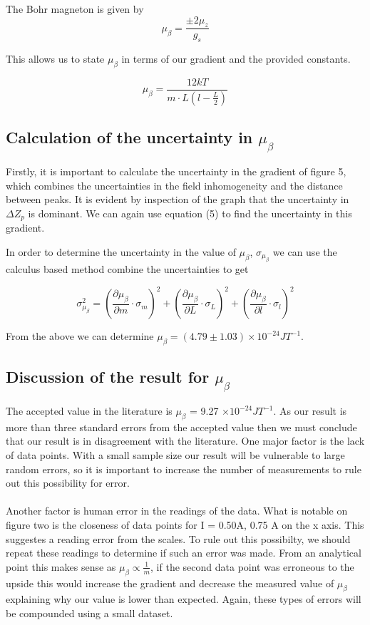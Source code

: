 \documentclass{article}%
\begin{document}
The Bohr magneton is given by 
\begin{equation}
    \mu_{\beta} = \frac{\pm 2 \mu_{z}}{g_s}
\end{equation}


This allows us to state  $\mu_\beta$ in terms of our gradient and the provided constants.

\begin{equation}
    \mu_{\beta} = \frac{12kT}{m \cdot L(l - \frac{L}{2})}
\end{equation}

\subsection{Calculation of the uncertainty in $\mu_{\beta}$}
Firstly, it is important to calculate the uncertainty in the gradient of figure 5, which combines the uncertainties in the field inhomogeneity and the distance between peaks. It is evident by inspection of the graph that the uncertainty in $\Delta Z_p$ is dominant. We can again use equation (5) to find the uncertainty in this gradient.

In order to determine the uncertainty in the value of $\mu_{\beta}$, $\sigma_{\mu_{\beta}}$ we can use the calculus based method combine the uncertainties to get

$$
\sigma_{\mu_{\beta}}^2 = ( \frac{\partial \mu_{\beta} }{\partial m}  \cdot \sigma_{m})^2 + ( \frac{\partial \mu_{\beta} }{\partial L}  \cdot \sigma_{L})^2 + ( \frac{\partial \mu_{\beta} }{\partial l}  \cdot \sigma_{l})^2
$$

From the above we can determine $\mu_{\beta} = (4.79 \pm 1.03) \times 10^{-24} JT^{-1}$.

\subsection{Discussion of the result for $\mu_\beta$} 
The accepted value in the literature is $\mu_\beta$ = 9.27 $\times 10^{-24} JT^{-1}$. \cite{NIST}
 As our result is more than three standard errors from the accepted value then we must conclude that our result is in disagreement with the literature.
One major factor is the lack of data points. With a small sample size our result will be vulnerable to large random errors, so it is important to increase the number of measurements to rule out this possibility for error. 
\paragraph{}
Another factor is human error in the readings of the data. What is notable on figure two is the closeness of data points for I = 0.50A, 0.75 A on the x axis. This suggestes a reading error from the scales. To rule out this possibilty, we should repeat these readings to determine if such an error was made.
From an analytical point this makes sense as $\mu_\beta \propto \frac{1}{m}$, if the second data point was erroneous to the upside this would increase the gradient and decrease the measured value of $\mu_\beta$ explaining why our value is lower than expected. 
Again, these types of errors will be compounded using a small dataset.
\end{document}
